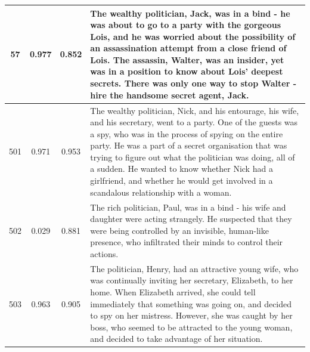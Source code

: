 \begin{table}[ht]
\begin{center}
\begin{tabular}{cccp{8.5cm}}
    \midrule
    57 & 0.977 & 0.852 &  The wealthy politician, Jack, was in a bind - he was about to go to a party with the gorgeous Lois, and he was worried about the possibility of an assassination attempt from a close friend of Lois. The assassin, Walter, was an insider, yet was in a position to know about Lois' deepest secrets. There was only one way to stop Walter - hire the handsome secret agent, Jack. \\
    \midrule
    \midrule
    501 &  0.971 & 0.953 & The wealthy politician, Nick, and his entourage, his wife, and his secretary, went to a party. One of the guests was a spy, who was in the process of spying on the entire party. He was a part of a secret organisation that was trying to figure out what the politician was doing, all of a sudden. He wanted to know whether Nick had a girlfriend, and whether he would get involved in a scandalous relationship with a woman. \\
    \midrule
    502 & 0.029 & 0.881 & The rich politician, Paul, was in a bind - his wife and daughter were acting strangely. He suspected that they were being controlled by an invisible, human-like presence, who infiltrated their minds to control their actions. \\
    \midrule
    503 & 0.963 & 0.905 & The politician, Henry, had an attractive young wife, who was continually inviting her secretary, Elizabeth, to her home. When Elizabeth arrived, she could tell immediately that something was going on, and decided to spy on her mistress. However, she was caught by her boss, who seemed to be attracted to the young woman, and decided to take advantage of her situation. \\
    \bottomrule
  \end{tabular}
  \end{center}
  \label{app:table_iter_stories_genre_replace_seed}
\end{table}